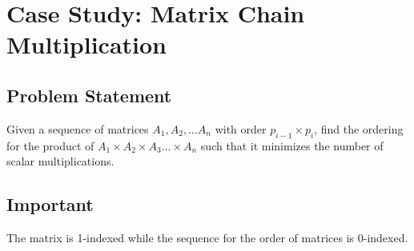 \section{Case Study: Matrix Chain Multiplication}

\subsection*{Problem Statement}
Given a sequence of matrices $A_1, A_2, ... A_n$ with order $p_{i-1} \times p_i$, find the ordering for the product of $A_1 \times A_2 \times A_3 ... \times A_n$ such that it minimizes the number of scalar multiplications.

\subsection*{Important}
The matrix is 1-indexed while the sequence for the order of matrices is 0-indexed.

